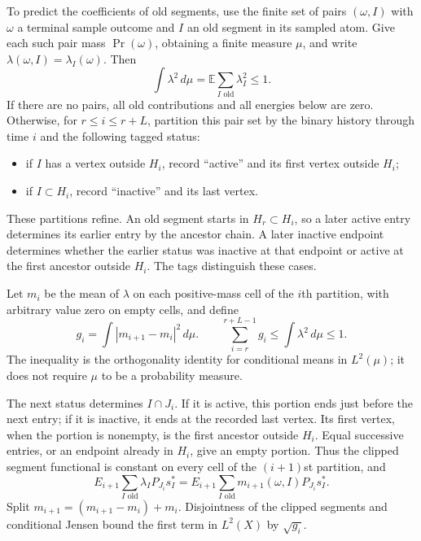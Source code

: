 To predict the coefficients of old segments, use the finite set of pairs
$(\omega,I)$ with $\omega$ a terminal sample outcome and $I$ an old
segment in its sampled atom.  Give each such pair mass $\Pr(\omega)$,
obtaining a finite measure $\mu$, and write
$\lambda(\omega,I)=\lambda_I(\omega)$.  Then
\[
 \int\lambda^2\,d\mu
 =\mathbb E\sum_{I\text{ old}}\lambda_I^2\le1.
\]
If there are no pairs, all old contributions and all energies below
are zero.  Otherwise, for $r\le i\le r+L$, partition this pair set by
the binary history through time $i$ and the following tagged status:
\begin{itemize}
 \item if $I$ has a vertex outside $H_i$, record ``active'' and its
       first vertex outside $H_i$;
 \item if $I\subset H_i$, record ``inactive'' and its last vertex.
\end{itemize}
These partitions refine.  An old segment starts in $H_r\subset H_i$,
so a later active entry determines its earlier entry by the ancestor
chain.  A later inactive endpoint determines whether the earlier status
was inactive at that endpoint or active at the first ancestor outside
$H_i$.  The tags distinguish these cases.

Let $m_i$ be the mean of $\lambda$ on each positive-mass cell of the
$i$th partition, with arbitrary value zero on empty cells, and define
\begin{equation}\label{dir:atomic:status-energy}
 g_i=\int|m_{i+1}-m_i|^2\,d\mu.
 \qquad
 \sum_{i=r}^{r+L-1}g_i\le\int\lambda^2\,d\mu\le1.
\end{equation}
The inequality is the orthogonality identity for conditional means in
$L^2(\mu)$; it does not require $\mu$ to be a probability measure.

The next status determines $I\cap J_i$.  If it is active, this portion
ends just before the next entry; if it is inactive, it ends at the
recorded last vertex.  Its first vertex, when the portion is nonempty,
is the first ancestor outside $H_i$.  Equal successive entries, or an
endpoint already in $H_i$, give an empty portion.  Thus the clipped
segment functional is constant on every cell of the $(i+1)$st
partition, and
\[
 E_{i+1}\sum_{I\text{ old}}\lambda_I P_{J_i}s_I^*
 =E_{i+1}\sum_{I\text{ old}}m_{i+1}(\omega,I)P_{J_i}s_I^*.
\]
Split $m_{i+1}=(m_{i+1}-m_i)+m_i$.  Disjointness of the clipped
segments and conditional Jensen bound the first term in $L^2(X)$ by
$\sqrt{g_i}$.

